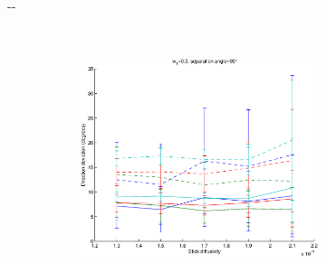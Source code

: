 \documentclass{article}
\begin{document}
\begin{figure}[H]
\begin{adjustwidth}{-\oddsidemargin}{-\rightmargin}
\begin{subfigure}{0.8\paperwidth}
\begin{subfigure}{0.3\textwidth}
      \end{subfigure}
      ~
      \begin{subfigure}{0.3\textwidth}
        \centering
        \includegraphics[width=\textwidth]{figures/synth_modbas_weights_diffus__snr=20__w1=3__angle=90.eps}
      \end{subfigure}
  \end{subfigure}


\end{adjustwidth}
\end{figure}
\end{document}
